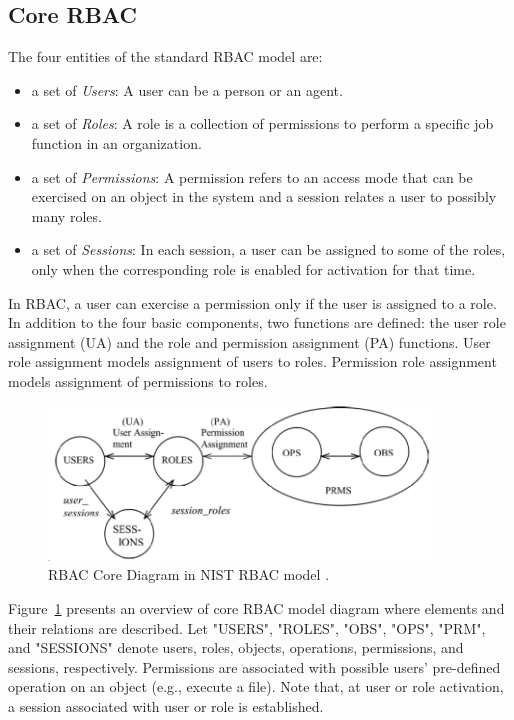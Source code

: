 \subsection{Core RBAC} 

The four entities of the standard RBAC model are:

\begin{itemize}
\setlength{\itemsep}{0.25pt}
\item a set of \emph{Users}: A user can be a person or an agent.
\item a set of \emph{Roles}: A role is a collection of permissions to perform a specific job function in an organization.
\item a set of \emph{Permissions}: A permission refers to an access mode that can be exercised on an object in the system and a session relates a user to possibly many roles.
\item a set of \emph{Sessions}: In each session, a user can be assigned to some of the roles, only when the corresponding role is enabled for activation for that time.		
\end{itemize}

In RBAC, a user can exercise a permission only if the user is assigned to a role.
In addition to the four basic components, two functions are defined:
the user role assignment (UA) and the role and permission assignment (PA) functions.
User role assignment models assignment of users to roles.
Permission role assignment models assignment of permissions to roles.

\begin{figure}[ht]
    \centering
        \includegraphics[width=4.0in]{sections/core-model.png}
    \caption{\label{fig:overview}RBAC Core Diagram in NIST RBAC model \cite{ferraiolokuhn}.}
\end{figure}

Figure~\ref{fig:overview} presents an overview of core RBAC model diagram where elements and their relations are described.
Let "USERS", "ROLES", "OBS", "OPS", "PRM", and "SESSIONS" denote users, roles, objects, operations, permissions, and sessions, respectively.
Permissions are associated with possible users' pre-defined operation on an object (e.g., execute a file).
Note that, at user or role activation, a session associated with user or role is established.

